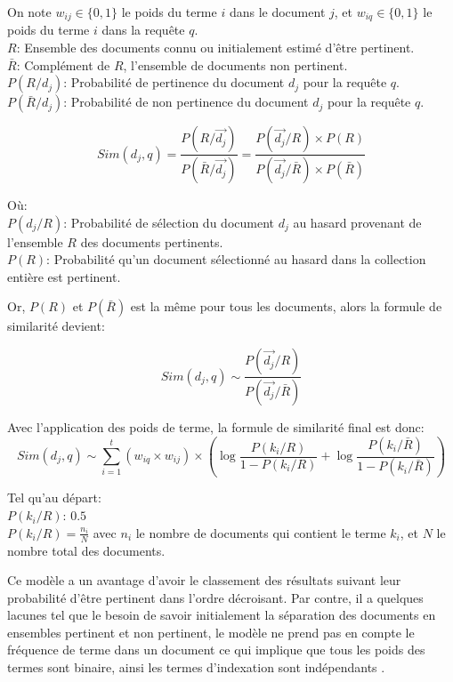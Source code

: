 \begin{definition}
    On note $w_{ij} \in \{0, 1\}$ le poids du terme $i$ dans le document $j$, et $w_{iq} \in \{0, 1\}$ le poids du terme $i$ dans la requête $q$.\\
    $R$: Ensemble des documents connu ou initialement estimé d'être pertinent.\\
    $\bar{R}$: Complément de $R$, l'ensemble de documents non pertinent.\\
    $P(R/d_{j})$: Probabilité de pertinence du document $d_{j}$ pour la requête $q$. \\
    $P(\bar{R}/d_{j})$: Probabilité de non pertinence du document $d_{j}$ pour la requête $q$.

    \[
        Sim(d_{j}, q) = \frac{ P(R/\vec{d_{j}}) }{ P(\bar{R}/\vec{d_{j}}) } = \frac{P(\vec{d_{j}}/R) \times P(R)}{P(\vec{d_{j}}/\bar{R}) \times P(\bar{R})}
    \]

    Où:\\
    $ P(d_{j}/R) $: Probabilité de sélection du document $ d_{j} $ au hasard provenant de l'ensemble $ R $ des documents pertinents.\\
    $ P(R) $: Probabilité qu'un document sélectionné au hasard dans la collection entière est pertinent.

    Or, $ P(R) $ et $ P(\bar{R}) $ est la même pour tous les documents, alors la formule de similarité devient:
    
    \[
        Sim(d_{j}, q) \sim \frac{P(\vec{d_{j}}/R)}{P(\vec{d_{j}}/\bar{R})}
    \]

    Avec l'application des poids de terme, la formule de similarité final est donc:
    \[
        Sim(d_{j}, q) \sim \sum_{i = 1}^{t} (w_{iq} \times w_{ij}) \times \left(
            \log{\frac{P(k_{i}/R)}{1 - P(k_{i}/R)}} + \log{\frac{P(k_{i}/\bar{R})}{1 - P(k_{i}/\bar{R})}}
        \right)
    \]

    Tel qu'au départ:\\
    $ P(k_{i}/R) $: $ 0.5 $ \\
    $ P(k_{i}/R) = \frac{n_{i}}{N} $ avec $ n_{i} $ le nombre de documents qui contient le terme $ k_{i} $, et $ N $ le nombre total des documents.
\end{definition}

Ce modèle a un avantage d'avoir le classement des résultats suivant leur probabilité d'être pertinent dans l'ordre décroisant. Par contre, il a quelques lacunes tel que le besoin de savoir initialement la séparation des documents en ensembles pertinent et non pertinent, le modèle ne prend pas en compte le fréquence de terme dans un document ce qui implique que tous les poids des termes sont binaire, ainsi les termes d'indexation sont indépendants \citep{modern-ir}.

